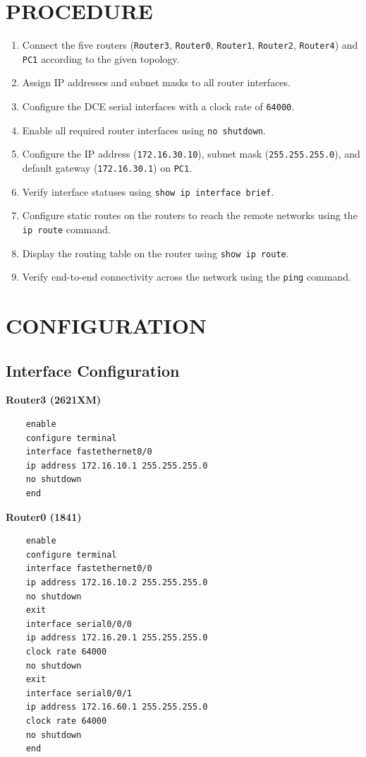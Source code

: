 \documentclass[12pt,a4paper]{article}
\begin{document}
\section*{PROCEDURE}
\begin{enumerate}
	\item Connect the five routers (\texttt{Router3}, \texttt{Router0}, \texttt{Router1}, \texttt{Router2}, \texttt{Router4}) and \texttt{PC1} according to the given topology.
	\item Assign IP addresses and subnet masks to all router interfaces.
	\item Configure the DCE serial interfaces with a clock rate of \texttt{64000}.
	\item Enable all required router interfaces using \texttt{no shutdown}.
	\item Configure the IP address (\texttt{172.16.30.10}), subnet mask (\texttt{255.255.255.0}), and default gateway (\texttt{172.16.30.1}) on \texttt{PC1}.
	\item Verify interface statuses using \texttt{show ip interface brief}.
	\item Configure static routes on the routers to reach the remote networks using the \texttt{ip route} command.
	\item Display the routing table on the router using \texttt{show ip route}.
	\item Verify end-to-end connectivity across the network using the \texttt{ping} command.
\end{enumerate}

\section*{CONFIGURATION}

\subsection*{Interface Configuration}
\textbf{Router3 (2621XM)}
\begin{lstlisting}
	enable
	configure terminal
	interface fastethernet0/0
	ip address 172.16.10.1 255.255.255.0
	no shutdown
	end
\end{lstlisting}

\textbf{Router0 (1841)}
\begin{lstlisting}
	enable
	configure terminal
	interface fastethernet0/0
	ip address 172.16.10.2 255.255.255.0
	no shutdown
	exit
	interface serial0/0/0
	ip address 172.16.20.1 255.255.255.0
	clock rate 64000
	no shutdown
	exit
	interface serial0/0/1
	ip address 172.16.60.1 255.255.255.0
	clock rate 64000
	no shutdown
	end
\end{lstlisting}
\end{document}
